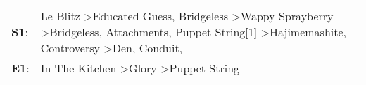 \begin{supertabular}{p{0.03\textwidth}p{0.92\textwidth}}
 \textbf{S1}:  &  Le Blitz\textsuperscript{} \textgreater \enspace Educated Guess\textsuperscript{}, \enspace Bridgeless\textsuperscript{} \textgreater \enspace Wappy Sprayberry\textsuperscript{} \textgreater \enspace Bridgeless\textsuperscript{}, \enspace Attachments\textsuperscript{}, \enspace Puppet String[1]\textsuperscript{} \textgreater \enspace Hajimemashite\textsuperscript{}, \enspace Controversy\textsuperscript{} \textgreater \enspace Den\textsuperscript{}, \enspace Conduit\textsuperscript{}, \textsuperscript{}  \enspace  \\
 \textbf{E1}:  &                                                                                                                                                                                                                                                                                                                                                                                                      In The Kitchen\textsuperscript{} \textgreater \enspace Glory\textsuperscript{} \textgreater \enspace Puppet String\textsuperscript{}  \enspace  \\
\end{supertabular}
